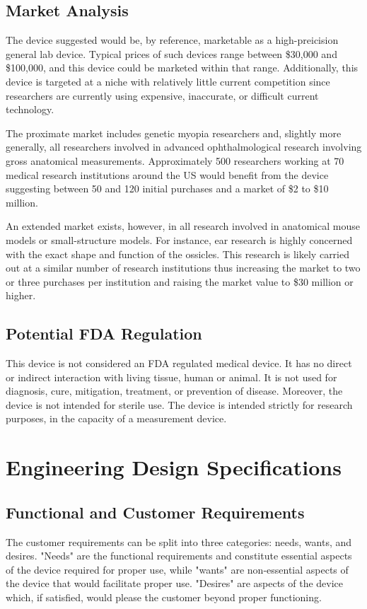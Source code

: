 \documentclass{article}
\begin{document}
\subsection{Market Analysis}
\label{sec:market-analysis}

The device suggested would be, by reference, marketable as a
high-preicision general lab device. Typical prices of such devices range between
\$30,000 and \$100,000, and this device could be marketed within that
range. Additionally, this device is targeted at a niche with
relatively little current competition since researchers are currently using expensive, inaccurate, or difficult current technology.

The proximate market includes genetic myopia researchers and, slightly
more generally, all researchers involved in advanced ophthalmological
research involving gross anatomical measurements. Approximately 500
researchers working at 70 medical research institutions around the US
would benefit from the device suggesting between 50 and 120 initial
purchases and a market of \$2 to \$10 million.

An extended market exists, however, in all research involved in
anatomical mouse models or small-structure models. For instance,
ear research is highly concerned with the exact shape and function of
the ossicles. This research is likely carried out at a similar number
of research institutions thus increasing the market to two or three
purchases per institution and raising the market value to \$30 million
or higher.

\subsection{Potential FDA Regulation}
\label{sec:potent-fda}

This device is not considered an FDA regulated medical device. It has
no direct or indirect interaction with living tissue, human or
animal. It is not used for diagnosis, cure, mitigation, treatment, or
prevention of disease. Moreover, the device is not intended for
sterile use. The device is intended strictly for research
purposes, in the capacity of a measurement device.

\section{Engineering Design Specifications}
\subsection{Functional and Customer Requirements}
The customer requirements can be split into three categories: needs, wants, and desires. "Needs" are the functional requirements and constitute essential aspects of the device required for proper use, while "wants" are non‐essential aspects of the device that would facilitate proper use. "Desires" are aspects of the device which, if satisfied, would please the customer beyond proper functioning.  
\end{document}
